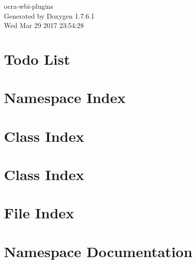 \documentclass[a4paper]{book}
\begin{document}
\hypersetup{pageanchor=false,citecolor=blue}
\begin{titlepage}
\vspace*{7cm}
\begin{center}
{\Large ocra-\/wbi-\/plugins }\\
\vspace*{1cm}
{\large \-Generated by Doxygen 1.7.6.1}\\
\vspace*{0.5cm}
{\small Wed Mar 29 2017 23:54:28}\\
\end{center}
\end{titlepage}
\clearemptydoublepage
{}
\tableofcontents
\clearemptydoublepage
{}
\hypersetup{pageanchor=true,citecolor=blue}
\chapter{\-Todo \-List}
\label{todo}
\hypertarget{todo}{}

\chapter{\-Namespace \-Index}

\chapter{\-Class \-Index}

\chapter{\-Class \-Index}

\chapter{\-File \-Index}

\chapter{\-Namespace \-Documentation}


\end{document}
